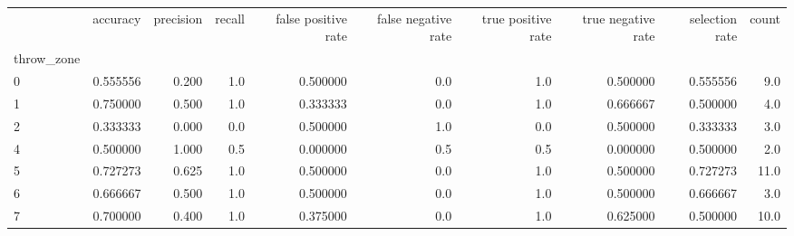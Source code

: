 \begin{tabular}{lrrrrrrrrr}
\toprule
{} &  accuracy &  precision &  recall &  false positive rate &  false negative rate &  true positive rate &  true negative rate &  selection rate &  count \\
throw\_zone &           &            &         &                      &                      &                     &                     &                 &        \\
\midrule
0          &  0.555556 &      0.200 &     1.0 &             0.500000 &                  0.0 &                 1.0 &            0.500000 &        0.555556 &    9.0 \\
1          &  0.750000 &      0.500 &     1.0 &             0.333333 &                  0.0 &                 1.0 &            0.666667 &        0.500000 &    4.0 \\
2          &  0.333333 &      0.000 &     0.0 &             0.500000 &                  1.0 &                 0.0 &            0.500000 &        0.333333 &    3.0 \\
4          &  0.500000 &      1.000 &     0.5 &             0.000000 &                  0.5 &                 0.5 &            0.000000 &        0.500000 &    2.0 \\
5          &  0.727273 &      0.625 &     1.0 &             0.500000 &                  0.0 &                 1.0 &            0.500000 &        0.727273 &   11.0 \\
6          &  0.666667 &      0.500 &     1.0 &             0.500000 &                  0.0 &                 1.0 &            0.500000 &        0.666667 &    3.0 \\
7          &  0.700000 &      0.400 &     1.0 &             0.375000 &                  0.0 &                 1.0 &            0.625000 &        0.500000 &   10.0 \\
\bottomrule
\end{tabular}
